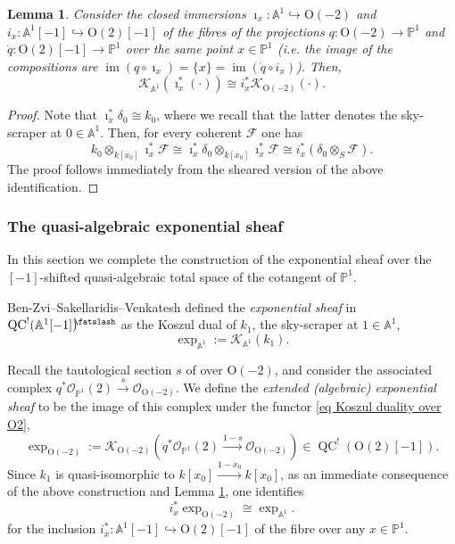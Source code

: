 \documentclass[11pt, a4paper]{amsart}
\numberwithin{equation}{section}
\newtheorem{lemma}[theorem]{Lemma}
\theoremstyle{definition}
\theoremstyle{remark}
\DeclareMathOperator{\QC}{QC}
\DeclareMathOperator{\im}{im}
\newcommand{\shear}{{\mathbin{\mkern-6mu\fatslash}}}
\newcommand{\Ff}{\mathcal{F}}
\newcommand{\Kk}{\mathcal{K}}
\newcommand{\Oo}{\mathcal{O}}
\renewcommand{\O}{\mathrm{O}}
\renewcommand{\AA}{\mathbb{A}}
\newcommand{\PP}{\mathbb{P}}
\renewcommand{\to}{\longrightarrow}
\begin{document}
\begin{lemma} \label{lm pointwise restriction of Koszul}
Consider the closed immersions $\imath_x:\AA^1 \hookrightarrow \O(-2)$ and $i_x:\AA^1[-1] \hookrightarrow \O(2)[-1]$ of the fibres of the projections $q : \O(-2) \to \PP^1$ and $\dot{q} : \O(2)[-1] \to \PP^1$ over the same point $x \in \PP^1$ ({\it i.e. } the image of the compositions are $\im(q \circ \imath_x) = \{ x \} = \im(\dot{q} \circ i_x)$). Then, 
\[
\Kk_{\AA^1}\left (\imath_x^*(\cdot) \right ) \cong i_x^*\Kk_{\O(-2)}(\cdot).
\]
\end{lemma}

\begin{proof}
Note that $\imath_x^* \delta_0 \cong k_0$, where we recall that the latter denotes the sky-scraper at $0 \in \AA^1$. Then, for every coherent $\Ff$ one has
\[
k_0 \otimes_{k[x_0]} \imath_x^* \Ff \cong \imath_x^* \delta_0 \otimes_{k[x_0]} \imath_x^*\Ff \cong i_x^* \left (\delta_0 \otimes_{S} \Ff \right ).
\]
The proof follows immediately from the sheared version of the above identification.
\end{proof}




\subsubsection{The quasi-algebraic exponential sheaf}
\label{sc qa exponential sheaf}

In this section we complete the construction of the exponential sheaf over the $[-1]$-shifted quasi-algebraic total space of the cotangent of $\PP^1$.  

Ben-Zvi--Sakellaridis--Venkatesh \cite[Appendix A.2]{BZSV} defined the {\it exponential sheaf} in $\QC^!(\AA^1[-1])^\shear$ as the Koszul dual of $k_1$, the sky-scraper at $1 \in \AA^1$,
\[
\exp_{\AA^1} := \Kk_{\AA^1}(k_1).
\]

Recall the tautological section $s$ of over $\O(-2)$, and consider the associated complex $q^*\Oo_{\PP^1}(2) \stackrel{s}{\to} \Oo_{\O(-2)}$. We define the {\it extended (algebraic) exponential sheaf} to be the image of this complex under the functor \eqref{eq Koszul duality over O2},
\[
\exp_{\O(-2)} := \Kk_{\O(-2)} \left (  q^*\Oo_{\PP^1}(2) \stackrel{1-s}{\to} \Oo_{\O(-2)}  \right ) \in \QC^!(\O(2)[-1]).
\]
Since $k_1$ is quasi-isomorphic to $k[x_0] \stackrel{1-x_0}{\to} k[x_0]$, as an immediate consequence of the above construction and Lemma \ref{lm pointwise restriction of Koszul}, one identifies 
\begin{equation} \label{eq justification of exp 1}
i_x^*\exp_{\O(-2)} \cong \exp_{\AA^1}.
\end{equation}
for the inclusion $i_x^* : \AA^1[-1] \hookrightarrow \O(2)[-1]$ of the fibre over any $x \in \PP^1$.
\end{document}

